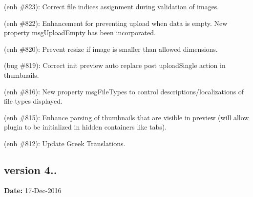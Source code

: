 \begin{DoxyItemize}
\item (enh \#823)\+: Correct file indices assignment during validation of images.
\item (enh \#822)\+: Enhancement for preventing upload when data is empty. New property {\ttfamily msg\+Upload\+Empty} has been incorporated.
\item (enh \#820)\+: Prevent resize if image is smaller than allowed dimensions.
\item (bug \#819)\+: Correct init preview auto replace post {\ttfamily upload\+Single} action in thumbnails.
\item (enh \#816)\+: New property {\ttfamily msg\+File\+Types} to control descriptions/localizations of file types displayed.
\item (enh \#815)\+: Enhance parsing of thumbnails that are visible in preview (will allow plugin to be initialized in hidden containers like tabs).
\item (enh \#812)\+: Update Greek Translations.
\end{DoxyItemize}

\subsection*{version 4..}

{\bfseries Date\+:} 17-\/\+Dec-\/2016


